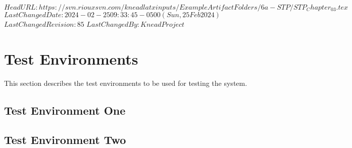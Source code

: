 \svnidlong
{$HeadURL: https://svn.riouxsvn.com/kneadlatxinputs/ExampleArtifactFolders/6a-STP/STP_Chapter_03.tex $}
{$LastChangedDate: 2024-02-25 09:33:45 -0500 (Sun, 25 Feb 2024) $}
{$LastChangedRevision: 85 $}
{$LastChangedBy: KneadProject $}


\chapter{Test Environments}
\label{loc:TestEnvironments}


This section describes the test environments to be used for testing the system.

\section{Test Environment One}
\label{loc:TestEnvironmentOne}
\newcommand{\TestEnvName}{TEone}%


\section{Test Environment Two}
\label{loc:TestEnvironmentTwo}
\renewcommand{\TestEnvName}{TEtwo}%




